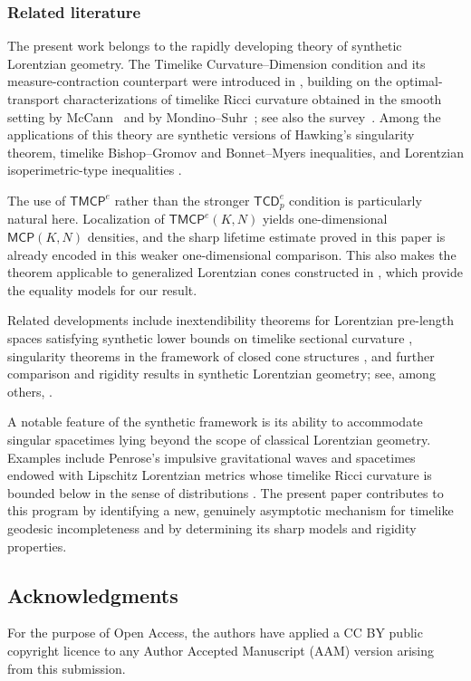 \documentclass[a4paper,10pt]{article}
\newcommand{\MCP}{\mathsf{MCP}}
\newcommand{\TMCP}{\mathsf{TMCP}}
\newcommand{\TCD}{\mathsf{TCD}}
\theoremstyle{plain}
\theoremstyle{definition}
\numberwithin{equation}{section}
\begin{document}
\subsubsection*{Related literature}

The present work belongs to the rapidly developing theory of synthetic
Lorentzian geometry. The Timelike Curvature--Dimension condition and its
measure-contraction counterpart were introduced in \cite{CaMo:20},
building on the optimal-transport characterizations of timelike Ricci
curvature obtained in the smooth setting by McCann~\cite{McCann} and by
Mondino--Suhr~\cite{MoSu}; see also the survey~\cite{CaMo:22}. Among the
applications of this theory are synthetic versions of Hawking's
singularity theorem, timelike Bishop--Gromov and Bonnet--Myers
inequalities, and Lorentzian isoperimetric-type inequalities
\cite{CaMo:20,cavalletti2024sharpisoperimetrictypeinequalitylorentzian}.

The use of $\TMCP^e$ rather than the stronger $\TCD^e_p$ condition is
particularly natural here. Localization of $\TMCP^e(K,N)$ yields
one-dimensional $\MCP(K,N)$ densities, and the sharp lifetime estimate
proved in this paper is already encoded in this weaker one-dimensional
comparison. This also makes the theorem applicable to generalized
Lorentzian cones constructed in \cite{CalistiKettererSaemann}, which
provide the equality models for our result.

Related developments include inextendibility theorems for Lorentzian
pre-length spaces satisfying synthetic lower bounds on timelike sectional
curvature \cite{GKS:19,AGKS:23,BHS:26}, singularity theorems in the
framework of closed cone structures \cite{Min}, and further comparison
and rigidity results in synthetic Lorentzian geometry; see, among others,
\cite{Braun,Octet,BraunMcCann,Braun:exact,BR:GL}.

A notable feature of the synthetic framework is its ability to accommodate
singular spacetimes lying beyond the scope of classical Lorentzian
geometry. Examples include Penrose's impulsive gravitational waves
\cite{MRS:IPPW} and spacetimes endowed with Lipschitz Lorentzian metrics
whose timelike Ricci curvature is bounded below in the sense of
distributions \cite{BSC:Lipsch}. The present paper contributes to this
program by identifying a new, genuinely asymptotic mechanism for timelike
geodesic incompleteness and by determining its sharp models and rigidity
properties.



\subsection*{Acknowledgments}
For the purpose of Open Access, the authors have applied a CC BY public copyright licence to any Author Accepted Manuscript (AAM) version arising from this submission.
\end{document}
